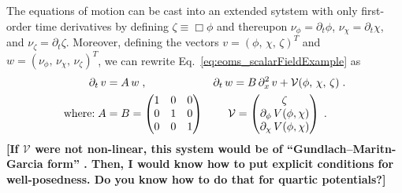 \documentclass[a4paper,oneside,openany,11pt]{memoir}
\numberwithin{equation}{section} %
\newcommand{\aaron}[1]{{\color{OliveGreen} #1}}
\begin{document}
The equations of motion can be cast into an extended sytstem with only first-order time derivatives by defining $\zeta \equiv \Box \phi$ and thereupon $\nu_\phi = \partial_t\phi$, $\nu_\chi = \partial_t\chi$, and $\nu_\zeta = \partial_t\zeta$. Moreover, defining the vectors $v = (\phi,\,\chi,\,\zeta)^T$ and $w = (\nu_\phi,\,\nu_\chi,\,\nu_\zeta)^T$, we can rewrite Eq.~\eqref{eq:eoms_scalarFieldExample} as
\begin{align}
    \partial_t\,v &= A\,w\;,
    \qquad\qquad\qquad
    \partial_t\,w = B\,\partial_x^2\,v + \mathcal{V}(\phi,\,\chi,\,\zeta)\;.
    \\\notag
    \text{where:}\; A&=B=\begin{pmatrix}1&0&0\\0&1&0\\0&0&1\end{pmatrix}\,\qquad
     \mathcal{V}=\begin{pmatrix}\zeta\\ \partial_\phi\,V(\phi,\chi)\\ \partial_\chi\,V(\phi,\chi)\end{pmatrix}\;.
\end{align}
\textbf{\aaron{[If $\mathcal{V}$ were not non-linear, this system would be of ``Gundlach--Maritn-Garcia form'' \cite{Gundlach:2005ta}. Then, I would know how to put explicit conditions for well-posedness. Do you know how to do that for quartic potentials?]}}



    
\end{document}

